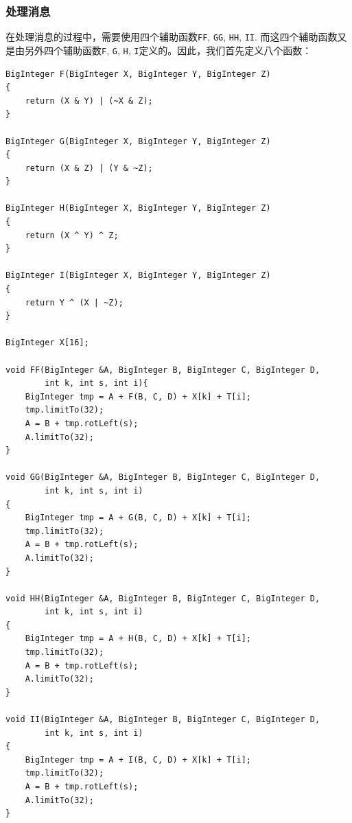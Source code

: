 \subsubsection{处理消息}
在处理消息的过程中，需要使用四个辅助函数\verb`FF`, \verb`GG`, \verb`HH`, \verb`II`. 而这四个辅助函数又是由另外四个辅助函数\verb`F`, \verb`G`, \verb`H`, \verb`I`定义的。因此，我们首先定义八个函数：
\begin{prove}
\begin{verbatim}
BigInteger F(BigInteger X, BigInteger Y, BigInteger Z)
{
    return (X & Y) | (~X & Z);
}

BigInteger G(BigInteger X, BigInteger Y, BigInteger Z)
{
    return (X & Z) | (Y & ~Z);
}

BigInteger H(BigInteger X, BigInteger Y, BigInteger Z)
{
    return (X ^ Y) ^ Z;
}

BigInteger I(BigInteger X, BigInteger Y, BigInteger Z)
{
    return Y ^ (X | ~Z);
}

BigInteger X[16];

void FF(BigInteger &A, BigInteger B, BigInteger C, BigInteger D, 
        int k, int s, int i){
    BigInteger tmp = A + F(B, C, D) + X[k] + T[i];
    tmp.limitTo(32);
    A = B + tmp.rotLeft(s);
    A.limitTo(32);
}

void GG(BigInteger &A, BigInteger B, BigInteger C, BigInteger D, 
        int k, int s, int i)
{
    BigInteger tmp = A + G(B, C, D) + X[k] + T[i];
    tmp.limitTo(32);
    A = B + tmp.rotLeft(s);
    A.limitTo(32);
}

void HH(BigInteger &A, BigInteger B, BigInteger C, BigInteger D, 
        int k, int s, int i)
{
    BigInteger tmp = A + H(B, C, D) + X[k] + T[i];
    tmp.limitTo(32);
    A = B + tmp.rotLeft(s);
    A.limitTo(32);
}

void II(BigInteger &A, BigInteger B, BigInteger C, BigInteger D, 
        int k, int s, int i)
{
    BigInteger tmp = A + I(B, C, D) + X[k] + T[i];
    tmp.limitTo(32);
    A = B + tmp.rotLeft(s);
    A.limitTo(32);
}
\end{verbatim}
\end{prove}

